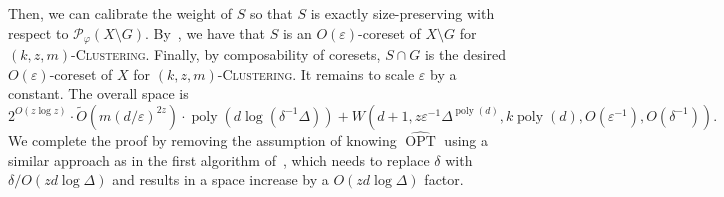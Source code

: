 \documentclass[letterpaper,11pt]{article}
\theoremstyle{plain}
\theoremstyle{definition}
\theoremstyle{remark}
\DeclareMathOperator{\poly}{poly}
\DeclareMathOperator{\OPT}{OPT}
\newcommand{\GOPT}{\widehat{\OPT}}
\newcommand{\eps}{\varepsilon}
\renewcommand{\phi}{\varphi}
\newcommand{\calP}{\mathcal{P}}
\newcommand{\ProblemName}[1]{\textsc{#1}}
\newcommand{\kzmC}{\ProblemName{$(k,z,m)$-Clustering}\xspace}
\begin{document}
Then, we can calibrate the weight of $S$ so that $S$ is exactly size-preserving with respect to $\calP_\phi(X\setminus G)$. By~, we have that $S$ is an $O(\eps)$-coreset of $X\setminus G$ for \kzmC. 
Finally, by composability of coresets, $S\cap G$ is the desired $O(\eps)$-coreset of $X$ for \kzmC. It remains to scale $\eps$ by a constant. The overall space is 
\begin{equation*}
    2^{O(z\log z)}\cdot\tilde O(m(d/\eps)^{2z})\cdot \poly(d\log(\delta^{-1}\Delta))+ W\left(d+1, z\eps^{-1}\Delta^{\poly(d)}, k\poly(d), O(\eps^{-1}), O(\delta^{-1})\right).
\end{equation*}
We complete the proof by removing the assumption of knowing $\GOPT$ using a similar approach as in the first algorithm of~, which needs to replace $\delta$ with $\delta/O(zd\log\Delta)$ and results in a space increase by a $O(zd\log\Delta)$ factor.































\end{document}

